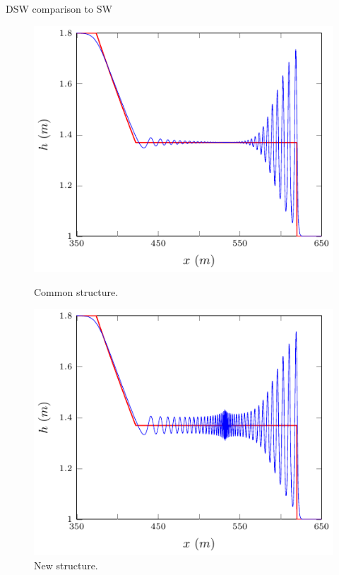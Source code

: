 \documentclass[pdf]{beamer}
\begin{document}

\begin{frame}{DSW comparison to SW}
	\begin{figure}
		\hspace*{-0.9cm}%
		\begin{minipage}{.5\textwidth}
			\includegraphics[width=1.2\linewidth]{./Pictures/DSW/DSWcompSW.pdf}
			\caption{Common structure.}
		\end{minipage}%
		\hspace*{0.9cm}%
		\begin{minipage}{.5\textwidth}
			\includegraphics[width=1.2\linewidth]{./Pictures/DSW/DSWcompSW1.pdf}
			\caption{New structure.}
		\end{minipage}
	\end{figure}
\end{frame}
\end{document}
